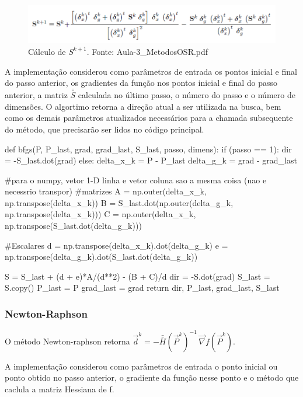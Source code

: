 \documentclass[10pt, a4paper]{article}
\begin{document}
\begin{figure}[htpb]
  \centering
  \includegraphics[scale=0.5]{bfgs_sk.PNG}
  \caption{Cálculo de $S^{k+1}$. Fonte: Aula-3\_MetodosOSR.pdf}
\end{figure}

A implementação considerou como parâmetros de entrada os pontos inicial e final do passo anterior, os gradientes da função nos pontos inicial e final do passo anterior,
a matriz $\bar{\bar{S}}$ calculada no último passo, o número do passo e o número de dimensões. O algortimo retorna a direção atual a ser utilizada na busca, bem como os
demais parâmetros atualizados necessários para a chamada subsequente do método, que precisarão ser lidos no código principal.

\begin{python}
  def bfgs(P, P_last, grad, grad_last, S_last, passo, dimens):
    if (passo == 1):
        dir = -S_last.dot(grad)
    else:
        delta_x_k = P - P_last
        delta_g_k = grad - grad_last
        
        #para o numpy, vetor 1-D linha e vetor coluna sao a mesma coisa (nao e necessrio transpor)
        #matrizes
        A = np.outer(delta_x_k, np.transpose(delta_x_k))
        B = S_last.dot(np.outer(delta_g_k, np.transpose(delta_x_k)))
        C = np.outer(delta_x_k, np.transpose(S_last.dot(delta_g_k)))
        
        #Escalares        
        d = np.transpose(delta_x_k).dot(delta_g_k)
        e = np.transpose(delta_g_k).dot(S_last.dot(delta_g_k))
                
        S = S_last + (d + e)*A/(d**2) - (B + C)/d
        dir = -S.dot(grad)
        S_last = S.copy()
    P_last = P
    grad_last = grad
    return dir, P_last, grad_last, S_last
\end{python}

\subsubsection{Newton-Raphson}
O método Newton-raphson retorna $\overrightarrow{d}^k = -\bar{\bar{H}}(\overrightarrow{P}^k)^{-1}\,\overrightarrow{\nabla}f(\overrightarrow{P}^k)$.

A implementação considerou como parâmetros de entrada o ponto inicial ou ponto obtido no passo anterior, o gradiente da função nesse ponto e o método que caclula
a matriz Hessiana de f.
\end{document}
